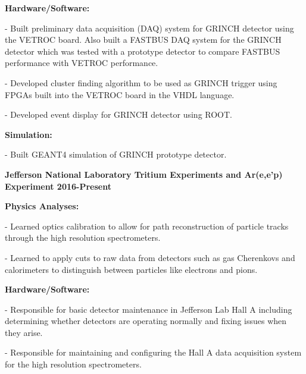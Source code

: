 \documentclass[letterpaper,10pt]{article}
\renewenvironment{itemize}{
  \begin{list}{}{
    \setlength{\leftmargin}{1.5em}
  }
}{
  \end{list}
}
\begin{document}
{\begin{itemize}
\begin{itemize}
  \item \textbf{Hardware/Software:}
    \begin{itemize}\itemsep1pt \parskip0pt 
     \item - Built preliminary data acquisition (DAQ) system for GRINCH detector using the VETROC board. Also built a FASTBUS DAQ system for the GRINCH detector which was tested with a prototype detector to compare FASTBUS performance with VETROC performance.
     \item - Developed cluster finding algorithm to be used as GRINCH trigger using FPGAs built into the VETROC board in the VHDL language.
     \item - Developed event display for GRINCH detector using ROOT. 
    \end{itemize}
    
   \item \textbf{Simulation:}
     \begin{itemize}\itemsep1pt \parskip0pt 
      \item - Built GEANT4 simulation of GRINCH prototype detector.
     \end{itemize} 
 \end{itemize}
 
 \item {\large {\bf Jefferson National Laboratory Tritium Experiments and Ar(e,e'p) Experiment 2016-Present} }

 \begin{itemize}\itemsep1pt \parskip0pt 
  \item \textbf{Physics Analyses:}
    \begin{itemize}\itemsep1pt \parskip0pt 
     \item - Learned optics calibration to allow for path reconstruction of particle tracks through the high resolution spectrometers.
     \item - Learned to apply cuts to raw data from detectors such as gas Cherenkovs and calorimeters to distinguish between particles like electrons and pions.
     \end{itemize}

  \item \textbf{Hardware/Software:}
    \begin{itemize}\itemsep1pt \parskip0pt 
     \item - Responsible for basic detector maintenance in Jefferson Lab Hall A including determining whether detectors are operating normally and fixing issues when they arise. 
     \item - Responsible for maintaining and configuring the Hall A data acquisition system for the high resolution spectrometers.
    \end{itemize}
    

\end{itemize}
\end{itemize}}
\end{document}
